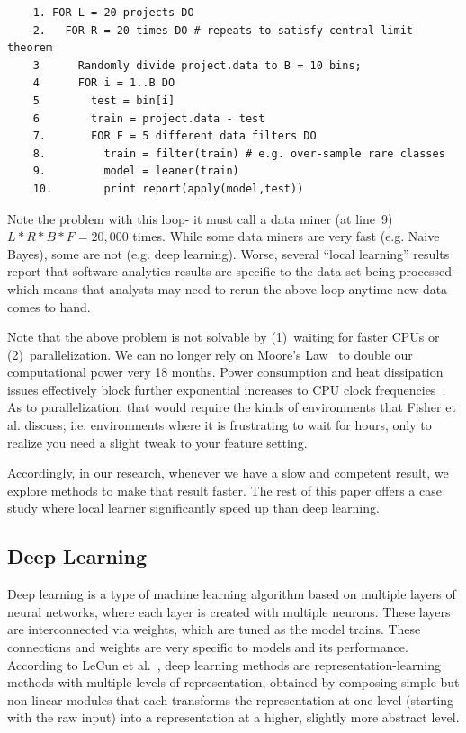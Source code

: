 \documentclass[sigconf]{acmart}
\theoremstyle{break}
\begin{document}
    {\footnotesize \begin{verbatim}
    1. FOR L = 20 projects DO
    2.   FOR R = 20 times DO # repeats to satisfy central limit theorem
    3      Randomly divide project.data to B = 10 bins;
    4      FOR i = 1..B DO
    5        test = bin[i]
    6        train = project.data - test
    7.       FOR F = 5 different data filters DO
    8.         train = filter(train) # e.g. over-sample rare classes
    9.         model = leaner(train)
    10.        print report(apply(model,test))
    \end{verbatim}
    }
    Note the problem with this loop- it must call a data miner (at line~9) 
    $L * R * B * F = 20,000$ times. While
    some data miners are very fast (e.g. Naive Bayes), some are not (e.g. deep learning). Worse, several ``local
    learning'' results~\cite{menzieslocal,menzies2011local,xia2008local,menzies2013local} report that software analytics results are specific to the data set being processed-
    which means that analysts may need to rerun the above loop anytime new data comes to hand.
    
    Note that the above problem is not solvable by (1)~waiting for faster CPUs or (2)~parallelization. We can no
    longer rely on Moore's Law~\cite{moore1998cramming} to double our computational power very 18 months. Power consumption
    and heat dissipation issues effectively block further exponential increases to CPU clock frequencies~\cite{moore1998cramming}. As
    to parallelization, that would require the kinds of environments that Fisher et al. discuss; i.e. environments
    where it is frustrating to wait for hours, only to realize you need a slight tweak to your feature setting. 
     
    Accordingly, in our research, whenever we have a slow and competent result, we explore methods to make that result faster. The rest of this paper offers a case study where local learner significantly speed up than deep learning.
\subsection{Deep Learning}\label{sec:dl}
    Deep learning is a type of machine learning algorithm based on multiple layers of neural networks, where each layer is created with multiple neurons. These layers are interconnected via weights, which are tuned as the model trains. These connections and weights are very specific to models and its performance. According to LeCun et al.~\cite{lecun2015deep}, deep learning methods are representation-learning methods with multiple levels of representation, obtained by composing simple but non-linear modules that each transforms the representation at one level (starting with the raw input) into a representation at a higher, slightly more abstract level. 
    
\end{document}
